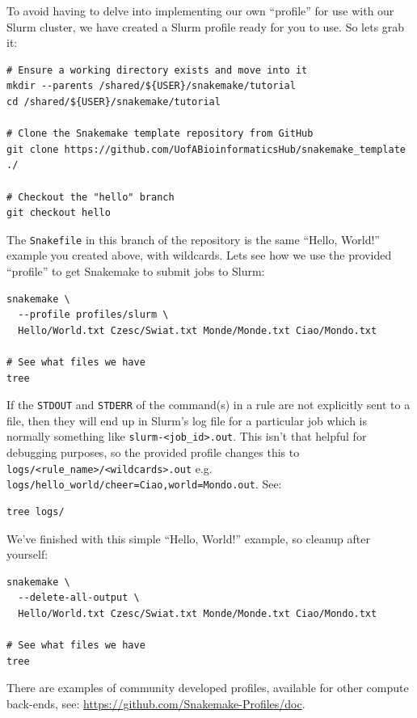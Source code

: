 To avoid having to delve into implementing our own ``profile'' for use with our Slurm cluster, we have created a Slurm profile ready for you to use. So lets grab it:

\begin{lstlisting}
# Ensure a working directory exists and move into it
mkdir --parents /shared/${USER}/snakemake/tutorial
cd /shared/${USER}/snakemake/tutorial

# Clone the Snakemake template repository from GitHub
git clone https://github.com/UofABioinformaticsHub/snakemake_template ./

# Checkout the "hello" branch
git checkout hello
\end{lstlisting}

The \texttt{Snakefile} in this branch of the repository is the same ``Hello, World!'' example you created above, with wildcards.
Lets see how we use the provided ``profile'' to get Snakemake to submit jobs to Slurm:

\begin{lstlisting}
snakemake \
  --profile profiles/slurm \
  Hello/World.txt Czesc/Swiat.txt Monde/Monde.txt Ciao/Mondo.txt

# See what files we have
tree
\end{lstlisting}

If the \texttt{STDOUT} and \texttt{STDERR} of the command(s) in a rule are not explicitly sent to a file, then they will end up in Slurm's log file for a particular job which is normally something like \texttt{slurm-<job\_id>.out}.
This isn't that helpful for debugging purposes, so the provided profile changes this to \texttt{logs/<rule\_name>/<wildcards>.out} e.g. \texttt{logs/hello\_world/cheer=Ciao,world=Mondo.out}. See:

\begin{lstlisting}
tree logs/
\end{lstlisting}

We've finished with this simple ``Hello, World!'' example, so cleanup after yourself:

\begin{lstlisting}
snakemake \
  --delete-all-output \
  Hello/World.txt Czesc/Swiat.txt Monde/Monde.txt Ciao/Mondo.txt

# See what files we have
tree
\end{lstlisting}

\begin{warning}

There are examples of community developed profiles, available for other compute back-ends, see: \url{https://github.com/Snakemake-Profiles/doc}.

\end{warning}

